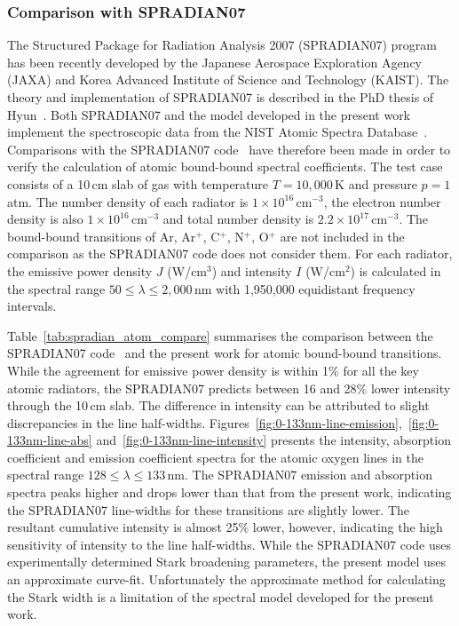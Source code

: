 \subsubsection{Comparison with SPRADIAN07}

The Structured Package for Radiation Analysis 2007 (SPRADIAN07) program has been recently developed by the Japanese Aerospace Exploration Agency (JAXA) and Korea Advanced Institute of Science and Technology (KAIST).
The theory and implementation of SPRADIAN07 is described in the PhD thesis of Hyun~\cite{hyun_phd}.
Both SPRADIAN07 and the model developed in the present work implement the spectroscopic data from the NIST Atomic Spectra Database~\cite{NIST_ASD}.
Comparisons with the SPRADIAN07 code~\cite{hyun_phd} have therefore been made in order to verify the calculation of atomic bound-bound spectral coefficients.
The test case consists of a 10\,cm slab of gas with temperature $T=10,000$\,K and pressure $p=1$\,atm.
The number density of each radiator is $1 \times 10^{16}$\,cm$^{-3}$, the electron number density is also $1 \times 10^{16}$\,cm$^{-3}$ and total number density is $2.2 \times 10^{17}$\,cm$^{-3}$.
The bound-bound transitions of Ar, Ar$^+$, C$^+$, N$^+$, O$^+$ are not included in the comparison as the SPRADIAN07 code does not consider them.
For each radiator, the emissive power density $J$ (W/cm$^3$) and intensity $I$ (W/cm$^2$) is calculated in the spectral range $ 50 \leq \lambda \leq 2,000$\,nm with 1,950,000 equidistant frequency intervals.  

\par

Table~\ref{tab:spradian_atom_compare} summarises the comparison between the SPRADIAN07 code~\cite{hyun_phd} and the present work for atomic bound-bound transitions.
While the agreement for emissive power density is within 1\% for all the key atomic radiators, the SPRADIAN07 predicts between 16 and 28\% lower intensity through the 10\,cm slab.
The difference in intensity can be attributed to slight discrepancies in the line half-widths.
Figures~\ref{fig:0-133nm-line-emission},~\ref{fig:0-133nm-line-abs} and~\ref{fig:0-133nm-line-intensity} presents the intensity, absorption coefficient and emission coefficient spectra for the atomic oxygen lines in the spectral range $128 \leq \lambda \leq 133$\,nm.
The SPRADIAN07 emission and absorption spectra peaks higher and drops lower than that from the present work, indicating the SPRADIAN07 line-widths for these transitions are slightly lower.
The resultant cumulative intensity is almost 25\% lower, however, indicating the high sensitivity of intensity to the line half-widths.
While the SPRADIAN07 code uses experimentally determined Stark broadening parameters, the present model uses an approximate curve-fit.
Unfortunately the approximate method for calculating the Stark width is a limitation of the spectral model developed for the present work.

